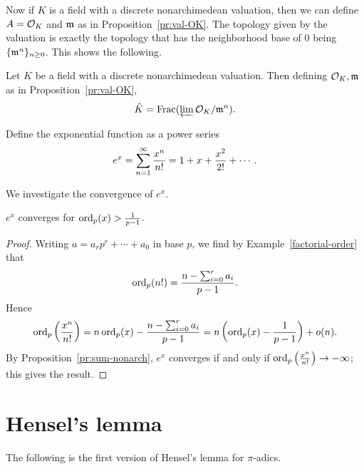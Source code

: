 Now if $K$ is a field with a discrete nonarchimedean valuation, then we can define $A=\mathcal{O}_K$ and $\mathfrak{m}$ as in Proposition~\ref{pr:val-OK}. The topology given by the valuation is exactly the topology that has the neighborhood base of 0 being $\{\mathfrak{m}^n\}_{n\ge 0}$. This shows the following.
\begin{pr}
Let $K$ be a field with a discrete nonarchimedean valuation. Then defining $\mathcal{O}_K,\mathfrak{m}$ as in Proposition~\ref{pr:val-OK}, 
\[
\hat{K}=\operatorname{Frac}(\varprojlim \mathcal{O}_K/\mathfrak{m}^n).
\]
\end{pr}

\begin{df}
Define the exponential function as a power series
\[
e^x=\sum_{n=1}^{\infty} \frac{x^n}{n!}=1+x+\frac{x^2}{2!}+\cdots.
\]
\end{df}
We investigate the convergence of $e^x$. 
\begin{pr}
$e^x$ converges for $\operatorname{ord}_p(x)>\frac{1}{p-1}$.
\end{pr}
\begin{proof}
Writing $a=a_rp^r+\cdots +a_0$ in base $p$, we find by Example~\ref{factorial-order} that
\[
\operatorname{ord}_p(n!)=\frac{n-\sum_{i=0}^r a_i}{p-1}.
\]
Hence 
\[\operatorname{ord}_p\left( {\frac{x^n}{n!}} \right)=n\operatorname{ord}_p(x)-\frac{n-\sum_{i=0}^r a_i}{p-1}=n\left( {\operatorname{ord}_p(x)-\frac{1}{p-1}} \right)+o(n).\]
By Proposition~\ref{pr:sum-nonarch}, $e^x$ converges if and only if $\operatorname{ord}_p\left( {\frac{x^n}{n!}} \right)\to -\infty$; this gives the result.
\end{proof}

\section{Hensel's lemma}
The following is the first version of Hensel's lemma for $\pi$-adics. 

